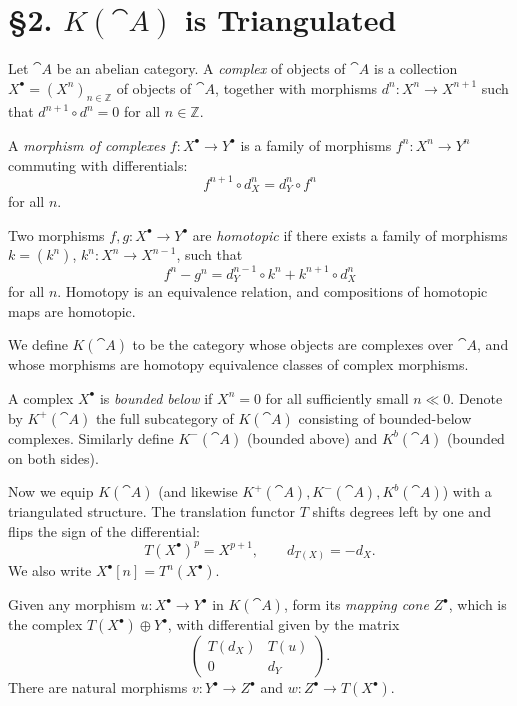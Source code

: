 \setcounter{page}{25}
\section{\S2. $K(\cat{A})$ is Triangulated}

Let \(\cat{A}\) be an abelian category. A \textit{complex} of objects of \(\cat{A}\) is a collection \(X^\bullet = (X^n)_{n\in\mathbb{Z}}\) of objects of \(\cat{A}\), together with morphisms \(d^n\colon X^n\to X^{n+1}\) such that \(d^{n+1}\circ d^n = 0\) for all \(n\in\mathbb{Z}\).

A \textit{morphism of complexes} \(f\colon X^\bullet\to Y^\bullet\) is a family of morphisms \(f^n\colon X^n\to Y^n\) commuting with differentials:
\[
f^{n+1}\circ d_X^n = d_Y^n\circ f^n
\]
for all \(n\).

Two morphisms \(f,g\colon X^\bullet\to Y^\bullet\) are \textit{homotopic} if there exists a family of morphisms \(k=(k^n)\), \(k^n\colon X^n\to X^{n-1}\), such that
\[
f^n - g^n = d_Y^{n-1}\circ k^n + k^{n+1}\circ d_X^n
\]
for all \(n\). Homotopy is an equivalence relation, and compositions of homotopic maps are homotopic.

We define \(K(\cat{A})\) to be the category whose objects are complexes over \(\cat{A}\), and whose morphisms are homotopy equivalence classes of complex morphisms.

A complex \(X^\bullet\) is \textit{bounded below} if \(X^n=0\) for all sufficiently small \(n\ll 0\). Denote by \(K^+(\cat{A})\) the full subcategory of \(K(\cat{A})\) consisting of bounded-below complexes. Similarly define \(K^-(\cat{A})\) (bounded above) and \(K^b(\cat{A})\) (bounded on both sides).

\setcounter{page}{26}
Now we equip \(K(\cat{A})\) (and likewise \(K^+(\cat{A}),K^-(\cat{A}),K^b(\cat{A})\)) with a triangulated structure.
The translation functor \(T\) shifts degrees left by one and flips the sign of the differential:
\[
T(X^\bullet)^p = X^{p+1},\qquad d_{T(X)} = -d_X.
\]
We also write \(X^\bullet[n] = T^n(X^\bullet)\).

Given any morphism \(u\colon X^\bullet\to Y^\bullet\) in \(K(\cat{A})\), form its \textit{mapping cone} \(Z^\bullet\), which is the complex \(T(X^\bullet)\oplus Y^\bullet\), with differential given by the matrix
\[
\begin{pmatrix}
T(d_X) & T(u)\\
0 & d_Y
\end{pmatrix}.
\]
There are natural morphisms \(v\colon Y^\bullet\to Z^\bullet\) and \(w\colon Z^\bullet\to T(X^\bullet)\).

